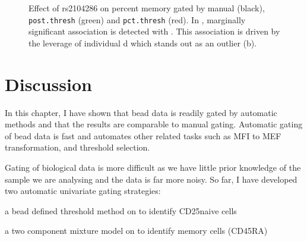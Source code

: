 \begin{figure}[h]
\begin{subfigure}[b]{.5\textwidth}
    \caption{}
\end{subfigure}
{Effect of rs2104286 on percent memory gated by manual (black), \texttt{post.thresh} (green) and \texttt{pct.thresh} (red).}
{
  In , marginally significant association is detected with .
  This association is driven by the leverage of individual d which stands out as an outlier (b).
}
\end{figure}



\clearpage


\section{Discussion}

%
In this chapter, I have shown that bead data is readily gated by automatic methods and that the results are comparable to manual gating.
Automatic gating of bead data is fast and automates other related tasks such as MFI to MEF transformation, and threshold selection.

Gating of biological data is more difficult as we have little prior knowledge of the sample we are analysing and the data is far more noisy.
So far, I have developed two automatic univariate gating strategies:
\begin{itemise}
\item a bead defined threshold method on  to identify CD25\positive naive cells
\item a two component mixture model on  to identify memory cells (CD45RA\negative)
\end{itemise}

